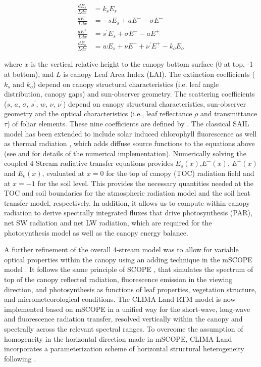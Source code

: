 \documentclass[twoside,10pt]{report}
\begin{document}
 \begin{align} 
 \frac{d E_s}{L dx} & = k_s E_s\\
\label{radiative_transfer:direct_solar_flux}
 \frac{d E^-}{L dx} & = -s E_s + a E^- - \sigma E^- \\
\label{radiative_transfer:downward_diffuse_flux}
 \frac{d E^+}{L dx} & = s^\prime E_s + \sigma E^- - a E^+ \\
\label{radiative_transfer:upward_diffuse_flux}
 \frac{d E_o}{L dx} & = w E_s + \nu E^- + \nu^\prime E^+ - k_o E_o\,
\label{radiative_transfer:flux_viewing_direction}
\end{align}

\noindent where $x$ is the vertical relative height to the canopy bottom surface (0 at top, -1 at bottom), and $L$ is canopy Leaf Area Index (LAI). The extinction coefficients ($k_s$ and $k_o$) depend on canopy structural characteristics (i.e. leaf angle distribution, canopy gaps) and sun-observer geometry. The scattering coefficients ($s$, $a$, $\sigma$, $s^\prime$, $w$, $\nu$, $\nu^\prime$) depend on canopy structural characteristics, sun-observer geometry and the optical characteristics (i.e., leaf reflectance $\rho$ and transmittance $\tau$) of foliar elements. These nine coefficients are defined by \citet{Verhoef1984}. The classical SAIL model has been extended to include solar induced chlorophyll fluorescence as well as thermal radiation \citep{VanderTol2009, Vilfan2016, verhoef2007unified}, which adds diffuse source functions to the equations above (see \citet{verhoef2007unified} and \citet{VanderTol2009} for details of the numerical implementation). Numerically solving the coupled 4-Stream radiative transfer equations provides $E_s(x)$,$E^-(x)$, $E^+(x)$ and $E_o(x)$, evaluated at $x=0$ for the top of canopy (TOC) radiation field and at $x=-1$ for the soil level. This provides the necessary quantities needed at the TOC and soil boundaries for the atmospheric radiation model and the soil heat transfer model, respectively. In addition, it allows us to compute within-canopy radiation to derive spectrally integrated fluxes that drive photosynthesis (PAR), net SW radiation and net LW radiation, which are required for the photosynthesis model as well as the canopy energy balance.     

A further refinement of the overall 4-stream model was to allow for variable optical properties within the canopy using an adding technique in the mSCOPE model \citep{Yang2017}. It follows the same principle of SCOPE \citep{VanderTol2009}, that simulates the spectrum of top of the canopy reflected radiation, fluorescence emission in the viewing direction, and photosynthesis as functions of leaf properties, vegetation structure, and micrometeorological conditions. The CLIMA Land RTM model is now implemented based on mSCOPE in a unified way for the short-wave, long-wave and fluorescence radiation transfer, resolved vertically within the canopy and spectrally across the relevant spectral ranges. To overcome the assumption of homogeneity in the horizontal direction made in mSCOPE, CLIMA Land incorporates a parameterization scheme of horizontal structural heterogeneity following \citet{pinty2006simplifying}.    
\end{document}
